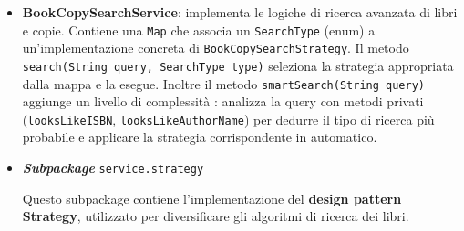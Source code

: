 \documentclass[
  italian,
  paper=a4,
  ,captions=tableheading
]{scrbook}
\newcommand{\passthrough}[1]{#1}
\begin{document}
\begin{itemize}
\begin{lstlisting}[language=Java, language=Java, caption={In questo metodo viene specificato come sono inviate le notifiche agli utenti.}, label={lst:emailservice}, label=lst:emailservice]
      try {
          MimeMessage message = mailSender.createMimeMessage();
          MimeMessageHelper helper = new MimeMessageHelper(message, true);
          helper.setFrom(fromAddress);
          helper.setTo(to);
          helper.setSubject(subject);
          helper.setText(body, false);
          mailSender.send(message);
          System.out.println("Email sent successfully to: " + to);
      } catch (MailException e) {
          System.err.println("Failed to send email to " + to + ": " + e.getMessage());
      } catch (MessagingException | RuntimeException e) {
          System.err.println("Failed to send email to " + to + ": " + e.getMessage());
      }
  }
\end{lstlisting}
\item
  \textbf{BookCopySearchService}: implementa le logiche di ricerca
  avanzata di libri e copie. Contiene una \passthrough{\lstinline!Map!}
  che associa un \passthrough{\lstinline!SearchType!} (enum) a
  un'implementazione concreta di
  \passthrough{\lstinline!BookCopySearchStrategy!}. Il metodo
  \passthrough{\lstinline!search(String query, SearchType type)!}
  seleziona la strategia appropriata dalla mappa e la esegue. Inoltre il
  metodo \passthrough{\lstinline!smartSearch(String query)!} aggiunge un
  livello di complessità : analizza la query con metodi privati
  (\passthrough{\lstinline!looksLikeISBN!},
  \passthrough{\lstinline!looksLikeAuthorName!}) per dedurre il tipo di
  ricerca più probabile e applicare la strategia corrispondente in
  automatico.
\item
  \textbf{\emph{Subpackage}} \passthrough{\lstinline!service.strategy!}

  Questo subpackage contiene l'implementazione del \textbf{design
  pattern Strategy}, utilizzato per diversificare gli algoritmi di
  ricerca dei libri.


\end{itemize}
\end{document}
